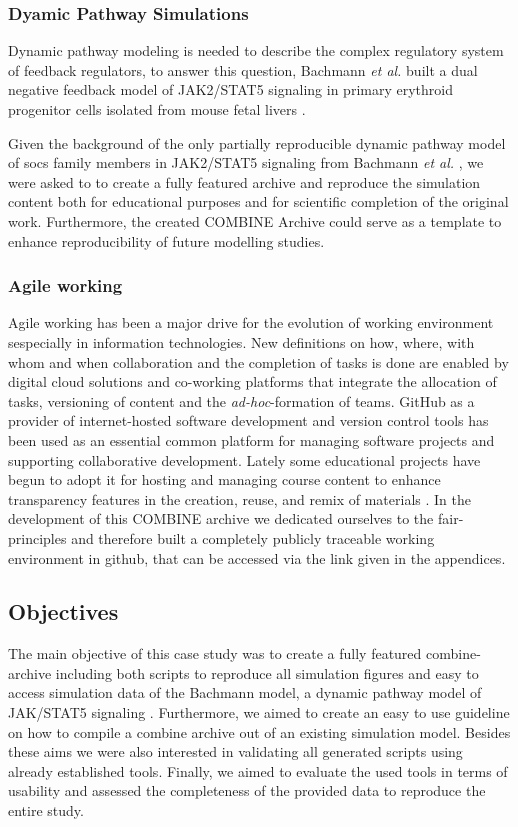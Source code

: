 \subsubsection*{Dyamic Pathway Simulations}
Dynamic pathway modeling is needed to describe the complex regulatory system of feedback regulators, to answer this question, Bachmann \textit{et al.} built a dual negative feedback model of JAK2/STAT5 signaling in primary erythroid progenitor cells isolated from mouse fetal livers \cite{bachmannmodel}.

Given the background of the only partially reproducible dynamic pathway model of \ac{socs} family members in JAK2/STAT5 signaling from Bachmann \textit{et al.} \cite{bachmannmodel}, we  were asked to  to create a fully featured archive and reproduce the simulation content both for educational purposes and for scientific completion of the original work. Furthermore, the created COMBINE Archive could serve as a template to enhance reproducibility of future modelling studies.

\subsubsection*{Agile working}
Agile working has been a major drive for the evolution of working environment sespecially in information technologies. New definitions on how, where, with whom and when collaboration and the completion of tasks is done are enabled by digital cloud solutions and co-working platforms that integrate the allocation of tasks, versioning of content and the \textit{ad-hoc}-formation of teams. GitHub as a provider of internet-hosted software development and version control tools has been used as an essential common platform for managing software projects and supporting collaborative development. Lately some educational projects have begun to adopt it for hosting and managing course content to enhance transparency features in the creation, reuse, and remix of materials \cite{github, Knegendorf.}. In the development of this COMBINE archive we dedicated ourselves to the \acs{fair}-principles and therefore built a completely publicly traceable working environment in github, that can be accessed via the link given in the appendices.

\subsection*{Objectives}
The main objective of this case study was to create a fully featured \acs{combine}-archive including both scripts to reproduce all simulation figures and easy to access simulation data of the Bachmann model, a dynamic pathway model of JAK/STAT5 signaling \cite{bachmannmodel}. Furthermore, we aimed to create an easy to use guideline on how to compile a \acs{combine} archive out of an existing simulation model. Besides these aims we were also interested in validating all generated scripts using already established tools. Finally, we aimed to evaluate the used tools in terms of usability and assessed the completeness of the provided data to reproduce the entire study.

